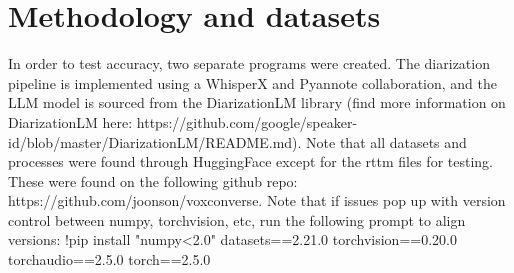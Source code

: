 \documentclass{article}
\begin{document}
\section{Methodology and datasets}
In order to test accuracy, two separate programs were created.\newline
The diarization pipeline is implemented using a WhisperX and Pyannote collaboration, and the LLM model is sourced from the DiarizationLM library (find more information on DiarizationLM here: https://github.com/google/speaker-id/blob/master/DiarizationLM/README.md).\newline
\newline
Note that all datasets and processes were found through HuggingFace except for the rttm files for testing. These were found on the following github repo: https://github.com/joonson/voxconverse.\newline
\newline
Note that if issues pop up with version control between numpy, torchvision, etc, run the following prompt to align versions:\newline
!pip install "numpy<2.0" datasets==2.21.0 torchvision==0.20.0 torchaudio==2.5.0 torch==2.5.0
\end{document}
